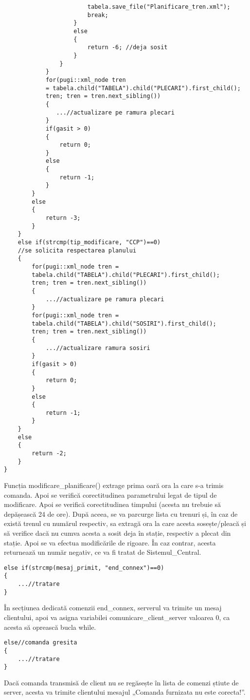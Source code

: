 \documentclass[runningheads]{llncs}
\begin{document}
\begin{verbatim}
                        tabela.save_file("Planificare_tren.xml");
                        break;
                    }
                    else
                    {
                        return -6; //deja sosit
                    }
                }
            }
            for(pugi::xml_node tren 
            = tabela.child("TABELA").child("PLECARI").first_child(); 
            tren; tren = tren.next_sibling())
            {
               ...//actualizare pe ramura plecari
            }
            if(gasit > 0)
            {
                return 0;
            }
            else
            {
                return -1;
            }
        }
        else
        {
            return -3;
        }
    }
    else if(strcmp(tip_modificare, "CCP")==0)
    //se solicita respectarea planului
    {
        for(pugi::xml_node tren = 
        tabela.child("TABELA").child("PLECARI").first_child(); 
        tren; tren = tren.next_sibling())
        {
            ...//actualizare pe ramura plecari
        }
        for(pugi::xml_node tren = 
        tabela.child("TABELA").child("SOSIRI").first_child(); 
        tren; tren = tren.next_sibling())
        {
            ...//actualizare ramura sosiri
        }
        if(gasit > 0)
        {
            return 0;
        }
        else
        {
            return -1;
        }
    }
    else
    {
        return -2;
    }
}
\end{verbatim}
Funcția modificare\_planificare() extrage prima oară ora la care s-a trimis comanda. Apoi se verifică corectitudinea parametrului legat de tipul de modificare. Apoi se verifică corectitudinea timpului (acesta nu trebuie să depășească 24 de ore). După aceea, se va parcurge lista cu trenuri și, în caz de există trenul cu numărul respectiv, sa extragă ora la care acesta sosește/pleacă și să verifice dacă nu cumva acesta a sosit deja în stație, respectiv a plecat din stație. Apoi se va efectua modificările de rigoare.  În caz contrar, acesta returnează un număr negativ, ce va fi tratat de Sistemul\_Central.

\begin{verbatim}
else if(strcmp(mesaj_primit, "end_connex")==0)
{
    ...//tratare
}
\end{verbatim}
În secțiunea dedicată comenzii end\_connex, serverul va trimite un mesaj clientului, apoi va asigna variabilei comunicare\_client\_server valoarea 0, ca acesta să oprească bucla while. 
\begin{verbatim}
else//comanda gresita
{
    ...//tratare
}
\end{verbatim}
Dacă comanda transmisă de client nu se regăsește în lista de comenzi știute de server, acesta va trimite clientului mesajul „Comanda furnizata nu este corecta!”.
\end{document}
